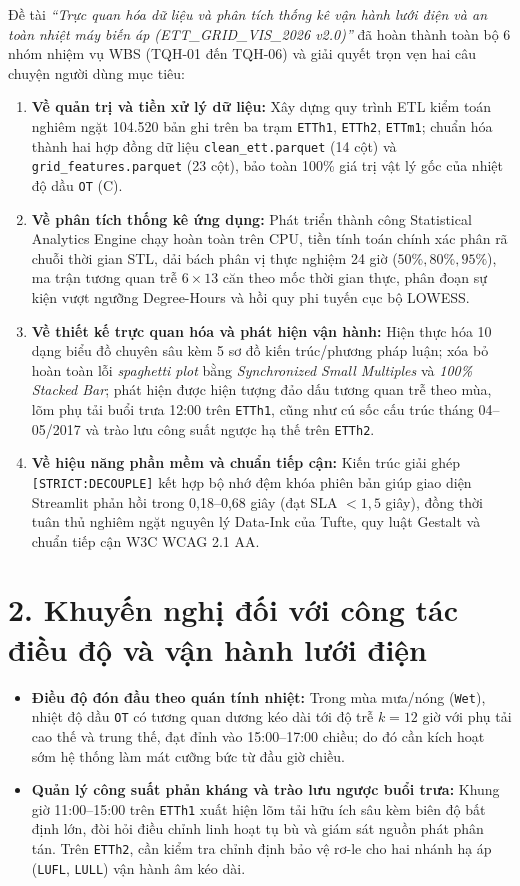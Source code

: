 \documentclass[12pt,a4paper,oneside]{report}
\newcommand{\dC}{\textdegree C\xspace}
\newcommand{\code}[1]{\texttt{#1}}
\begin{document}
Đề tài \textit{``Trực quan hóa dữ liệu và phân tích thống kê vận hành lưới điện và an toàn nhiệt máy biến áp (ETT\_GRID\_VIS\_2026 v2.0)''} đã hoàn thành toàn bộ 6 nhóm nhiệm vụ WBS (TQH-01 đến TQH-06) và giải quyết trọn vẹn hai câu chuyện người dùng mục tiêu:
\begin{enumerate}
  \item \textbf{Về quản trị và tiền xử lý dữ liệu:} Xây dựng quy trình ETL kiểm toán nghiêm ngặt 104.520 bản ghi trên ba trạm \code{ETTh1}, \code{ETTh2}, \code{ETTm1}; chuẩn hóa thành hai hợp đồng dữ liệu \code{clean\_ett.parquet} (14 cột) và \code{grid\_features.parquet} (23 cột), bảo toàn 100\% giá trị vật lý gốc của nhiệt độ dầu \code{OT} (\dC).
  \item \textbf{Về phân tích thống kê ứng dụng:} Phát triển thành công Statistical Analytics Engine chạy hoàn toàn trên CPU, tiền tính toán chính xác phân rã chuỗi thời gian STL, dải bách phân vị thực nghiệm 24 giờ ($50\%, 80\%, 95\%$), ma trận tương quan trễ $6\times 13$ căn theo mốc thời gian thực, phân đoạn sự kiện vượt ngưỡng Degree-Hours và hồi quy phi tuyến cục bộ LOWESS.
  \item \textbf{Về thiết kế trực quan hóa và phát hiện vận hành:} Hiện thực hóa 10 dạng biểu đồ chuyên sâu kèm 5 sơ đồ kiến trúc/phương pháp luận; xóa bỏ hoàn toàn lỗi \textit{spaghetti plot} bằng \textit{Synchronized Small Multiples} và \textit{100\% Stacked Bar}; phát hiện được hiện tượng đảo dấu tương quan trễ theo mùa, lõm phụ tải buổi trưa 12:00 trên \code{ETTh1}, cũng như cú sốc cấu trúc tháng 04--05/2017 và trào lưu công suất ngược hạ thế trên \code{ETTh2}.
  \item \textbf{Về hiệu năng phần mềm và chuẩn tiếp cận:} Kiến trúc giải ghép \code{[STRICT:DECOUPLE]} kết hợp bộ nhớ đệm khóa phiên bản giúp giao diện Streamlit phản hồi trong 0,18--0,68 giây (đạt SLA $< 1{,}5$ giây), đồng thời tuân thủ nghiêm ngặt nguyên lý Data-Ink của Tufte, quy luật Gestalt và chuẩn tiếp cận W3C WCAG 2.1 AA.
\end{enumerate}

\section*{2. Khuyến nghị đối với công tác điều độ và vận hành lưới điện}

\begin{itemize}
  \item \textbf{Điều độ đón đầu theo quán tính nhiệt:} Trong mùa mưa/nóng (\code{Wet}), nhiệt độ dầu \code{OT} có tương quan dương kéo dài tới độ trễ $k = 12$ giờ với phụ tải cao thế và trung thế, đạt đỉnh vào 15:00--17:00 chiều; do đó cần kích hoạt sớm hệ thống làm mát cưỡng bức từ đầu giờ chiều.
  \item \textbf{Quản lý công suất phản kháng và trào lưu ngược buổi trưa:} Khung giờ 11:00--15:00 trên \code{ETTh1} xuất hiện lõm tải hữu ích sâu kèm biên độ bất định lớn, đòi hỏi điều chỉnh linh hoạt tụ bù và giám sát nguồn phát phân tán. Trên \code{ETTh2}, cần kiểm tra chỉnh định bảo vệ rơ-le cho hai nhánh hạ áp (\code{LUFL}, \code{LULL}) vận hành âm kéo dài.
\end{itemize}
\end{document}
